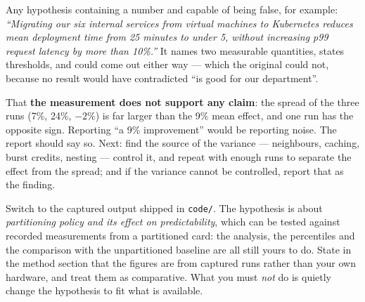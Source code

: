 \begin{ans}
  \item Any hypothesis containing a number and capable of being false, for
        example: \emph{``Migrating our six internal services from virtual
        machines to Kubernetes reduces mean deployment time from 25 minutes to
        under 5, without increasing p99 request latency by more than 10\%.''}
        It names two measurable quantities, states thresholds, and could come
        out either way --- which the original could not, because no result would
        have contradicted ``is good for our department''.
  \item That \textbf{the measurement does not support any claim}: the spread of
        the three runs (7\%, 24\%, $-2$\%) is far larger than the 9\% mean
        effect, and one run has the opposite sign. Reporting ``a 9\%
        improvement'' would be reporting noise. The report should say so. Next:
        find the source of the variance --- neighbours, caching, burst credits,
        nesting --- control it, and repeat with enough runs to separate the
        effect from the spread; and if the variance cannot be controlled, report
        that as the finding.
  \item Switch to the captured output shipped in \texttt{code/}. The hypothesis
        is about \emph{partitioning policy and its effect on predictability},
        which can be tested against recorded measurements from a partitioned
        card: the analysis, the percentiles and the comparison with the
        unpartitioned baseline are all still yours to do. State in the method
        section that the figures are from captured runs rather than your own
        hardware, and treat them as comparative. What you must \emph{not} do is
        quietly change the hypothesis to fit what is available.
\end{ans}
